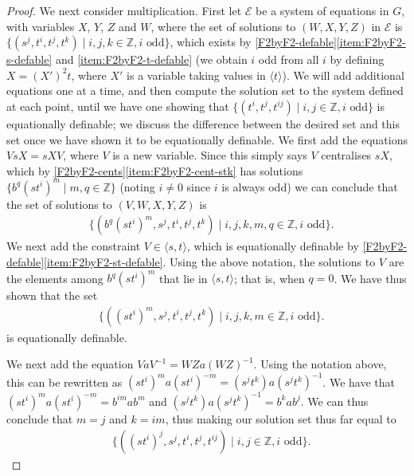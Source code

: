 \documentclass[11pt]{amsart}
\theoremstyle{definition}
\numberwithin{theorem}{section}
\newcommand{\Z}{\mathbb{Z}}
\begin{document}
\begin{proof}
We next consider multiplication. First let \(\mathcal E\) be a system
		of equations in \(G\), with variables \(X\), \(Y\), \(Z\) and \(W\),
		where the set of solutions to \((W,  X, Y, Z)\) in \(\mathcal
		E\) is \(\{(s^j, t^i, t^j, t^k) \mid i, j, k \in \Z, i
		\textrm{ odd}\}\), which exists by \cref{F2byF2-defable}\eqref{item:F2byF2-s-defable}
		and \eqref{item:F2byF2-t-defable}
(we obtain
		\(i\) odd from all \(i\) by defining \(X = (X')^2 t\), where \(X'\) is
		a variable taking values in \(\langle t \rangle\)). We will add
		additional equations one at a time, and then compute the solution set
		to the system defined at each point, until we have one showing that
		\(\{(t^i, t^j, t^{ij}) \mid i, j \in \Z, i \textrm{ odd}\}\) is
		equationally definable; we discuss the difference between the desired
		set and this set once we have shown it to be equationally definable.
		We first add the equations \(V sX = sX V\), where \(V\) is a new
		variable. Since this simply says \(V\) centralises \(sX\),
		which by \cref{F2byF2-cents}\eqref{item:F2byF2-cent-stk} has solutions \(\{b^q (st^i)^m \mid m,
		q\in \Z\}\)
 (noting \(i \neq 0\) since \(i\) is always odd)
		we can conclude that the set of solutions to \((V, W, X, Y, Z)\)
		is
		\begin{align*}
				&\{(b^q (st^i)^m, s^j, t^i, t^j, t^k) \mid i, j, k, m,q \in \Z, i \textrm{ odd}\}.
		\end{align*}
		We next add the constraint \(V \in \langle s, t \rangle\), which
		is equationally definable by \cref{F2byF2-defable}\eqref{item:F2byF2-st-defable}.
		Using the above notation, the solutions to \(V\) are the elements
		among \(b^q (st^i)^m\) that lie in \(\langle s, t \rangle\); that
		is, when \(q = 0\). We have thus shown that the set
		\begin{align*}
				&\{((st^i)^m, s^j, t^i, t^j, t^k) \mid i, j, k, m \in \Z, i \textrm{ odd}\}.
		\end{align*}
		is equationally definable.

		We next add the equation \(VaV^{-1} = WZ a (WZ)^{-1}\). Using the notation
		above, this can be rewritten as \((st^i)^m a (st^i)^{-m} = (s^j t^k) a
		(s^j t^k)^{-1}\). We have that \((st^i)^m a (st^i)^{-m} = b^{im} a b^m\)
		and \((s^j t^k) a (s^j t^k)^{-1} = b^k a b^j\). We can thus
		conclude that \(m = j\) and \(k = im\), thus making our solution set
		thus far equal to
		\begin{align*}
				&\{((st^i)^j, s^j, t^i, t^j, t^{ij}) \mid i, j \in \Z, i \textrm{ odd}\}.
		\end{align*}


\end{proof}
\end{document}
